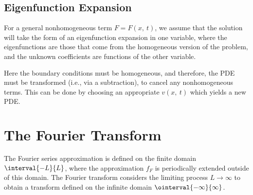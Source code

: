 \documentclass{article}
\begin{document}
\subsection{Eigenfunction Expansion}
For a general nonhomogeneous term \(F = F\left( x,\: t \right)\), we
assume that the solution will take the form of an eigenfunction
expansion in one variable, where the eigenfunctions are those that come
from the homogeneous version of the problem, and the unknown
coefficients are functions of the other variable.

Here the boundary conditions must be homogeneous, and therefore, the
PDE must be transformed (i.e., via a subtraction), to cancel any
nonhomogeneous terms. This can be done by choosing an appropriate
\(v\left( x,\: t \right)\) which yields a new PDE.
\section{The Fourier Transform}
The Fourier series approximation is defined on the finite domain
\(\interval{-L}{L}\), where the approximation \(f_F\) is periodically
extended outside of this domain. The Fourier transform considers the
limiting process \(L \to \infty\) to obtain a transform defined on the
infinite domain \(\ointerval{-\infty}{\infty}\).
\end{document}
